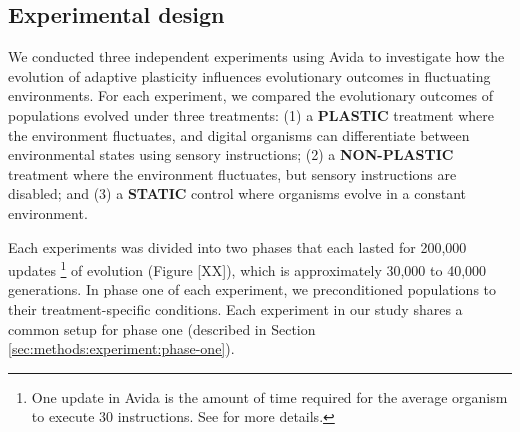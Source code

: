 \vspace{0.7cm}
\subsection{Experimental design}
\label{sec:methods:experiment}


We conducted three independent experiments using Avida to investigate how the evolution of adaptive plasticity influences evolutionary outcomes in fluctuating environments.
For each experiment, we compared the evolutionary outcomes of populations evolved under three treatments: 
(1) a \textbf{PLASTIC} treatment where the environment fluctuates, and digital organisms can differentiate between environmental states using sensory instructions;
(2) a \textbf{NON-PLASTIC} treatment where the environment fluctuates, but sensory instructions are disabled;
and (3) a \textbf{STATIC} control where organisms evolve in a constant environment.

Each experiments was divided into two phases that each lasted for 200,000 updates \footnote{
    One update in Avida is the amount of time required for the average organism to execute 30 instructions. 
    See \citep{ofria_avida:_2009} for more details.
} of evolution (Figure [XX]), which is approximately 30,000 to 40,000 generations.
In phase one of each experiment, we preconditioned populations to their treatment-specific conditions.
Each experiment in our study shares a common setup for phase one (described in Section \ref{sec:methods:experiment:phase-one}). 


